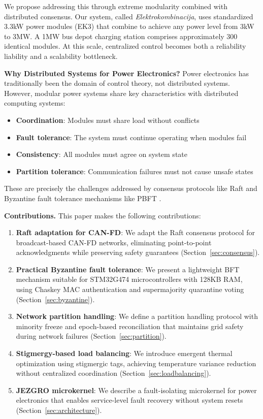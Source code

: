 \documentclass[conference,10pt]{IEEEtran}
\begin{document}
We propose addressing this through extreme modularity combined with distributed consensus. Our system, called \textit{Elektrokombinacija}, uses standardized 3.3kW power modules (EK3) that combine to achieve any power level from 3kW to 3MW. A 1MW bus depot charging station comprises approximately 300 identical modules. At this scale, centralized control becomes both a reliability liability and a scalability bottleneck.

\textbf{Why Distributed Systems for Power Electronics?} Power electronics has traditionally been the domain of control theory, not distributed systems. However, modular power systems share key characteristics with distributed computing systems:
\begin{itemize}
    \item \textbf{Coordination}: Modules must share load without conflicts
    \item \textbf{Fault tolerance}: The system must continue operating when modules fail
    \item \textbf{Consistency}: All modules must agree on system state
    \item \textbf{Partition tolerance}: Communication failures must not cause unsafe states
\end{itemize}

These are precisely the challenges addressed by consensus protocols like Raft \cite{ongaro2014raft} and Byzantine fault tolerance mechanisms like PBFT \cite{castro1999practical}.

\textbf{Contributions.} This paper makes the following contributions:

\begin{enumerate}
    \item \textbf{Raft adaptation for CAN-FD}: We adapt the Raft consensus protocol for broadcast-based CAN-FD networks, eliminating point-to-point acknowledgments while preserving safety guarantees (Section~\ref{sec:consensus}).

    \item \textbf{Practical Byzantine fault tolerance}: We present a lightweight BFT mechanism suitable for STM32G474 microcontrollers with 128KB RAM, using Chaskey MAC authentication and supermajority quarantine voting (Section~\ref{sec:byzantine}).

    \item \textbf{Network partition handling}: We define a partition handling protocol with minority freeze and epoch-based reconciliation that maintains grid safety during network failures (Section~\ref{sec:partition}).

    \item \textbf{Stigmergy-based load balancing}: We introduce emergent thermal optimization using stigmergic tags, achieving temperature variance reduction without centralized coordination (Section~\ref{sec:loadbalancing}).

    \item \textbf{JEZGRO microkernel}: We describe a fault-isolating microkernel for power electronics that enables service-level fault recovery without system resets (Section~\ref{sec:architecture}).
\end{enumerate}
\end{document}
